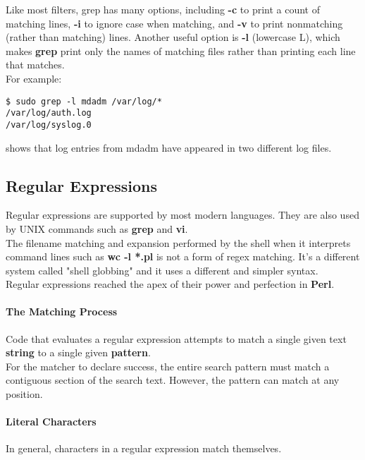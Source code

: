 \documentclass[10pt,letterpaper]{book}
\begin{document}
Like most filters, grep has many options, including \textbf{-c} to print a count of matching lines, \textbf{-i} to ignore case when matching, and \textbf{-v} to print nonmatching (rather than matching) lines. Another useful option is \textbf{-l} (lowercase L), which makes \textbf{grep} print only the names of matching files rather than printing each line that matches.\\
For example:
\begin{lstlisting}
$ sudo grep -l mdadm /var/log/*
/var/log/auth.log
/var/log/syslog.0
\end{lstlisting}
shows that log entries from mdadm have appeared in two different log files.
\subsection{Regular Expressions}
Regular expressions are supported by most modern languages. They are also used by UNIX commands such as \textbf{grep} and \textbf{vi}.\\
The filename matching and expansion performed by the shell when it interprets command lines such as \textbf{wc -l *.pl} is not a form of regex matching. It's a different system called "shell globbing" and it uses a different and simpler syntax.\\
Regular expressions reached the apex of their power and perfection in \textbf{Perl}.\\
\paragraph*{The Matching Process}
Code that evaluates a regular expression attempts to match a single given text \textbf{string} to a single given \textbf{pattern}.\\
For the matcher to declare success, the entire search pattern must match a contiguous section of the search text. However, the pattern can match at any position.
\paragraph*{Literal Characters}
In general, characters in a regular expression match themselves.
\end{document}

